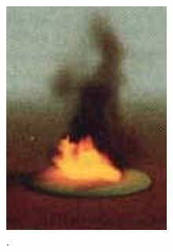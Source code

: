 \begin{figure}[htpb!]
        \centering
        \begin{subfigure}[t]{0.2\textwidth}
                \includegraphics[width=\textwidth]{img/stam_1995}
                \caption{\cite{Stam:1995}.}
        \end{subfigure}%
        \quad %
        \begin{subfigure}[t]{0.22\textwidth}

\end{subfigure}
\end{figure}
